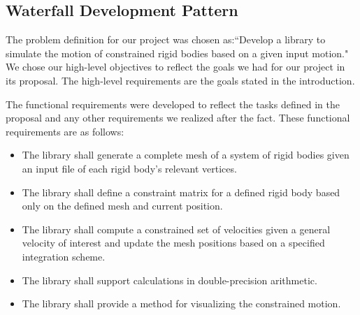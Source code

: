 \subsection{Waterfall Development Pattern}
The problem definition for our project was chosen as:``Develop a library to simulate the motion of constrained rigid bodies based on a given input motion."
We chose our high-level objectives to reflect the goals we had for our project in its proposal. The high-level requirements are the goals stated in the introduction.

The functional requirements were developed to reflect the tasks defined in the proposal and any other requirements we realized after the fact. These functional requirements are as follows:

\begin{itemize}
    \item The library shall generate a complete mesh of a system of rigid bodies given an input file of each rigid body's relevant vertices.
    \item The library shall define a constraint matrix for a defined rigid body based only on the defined mesh and current position.
    \item The library shall compute a constrained set of velocities given a general velocity of interest and update the mesh positions based on a specified integration scheme.
    \item The library shall support calculations in double-precision arithmetic.
    \item The library shall provide a method for visualizing the constrained motion.
\end{itemize}

